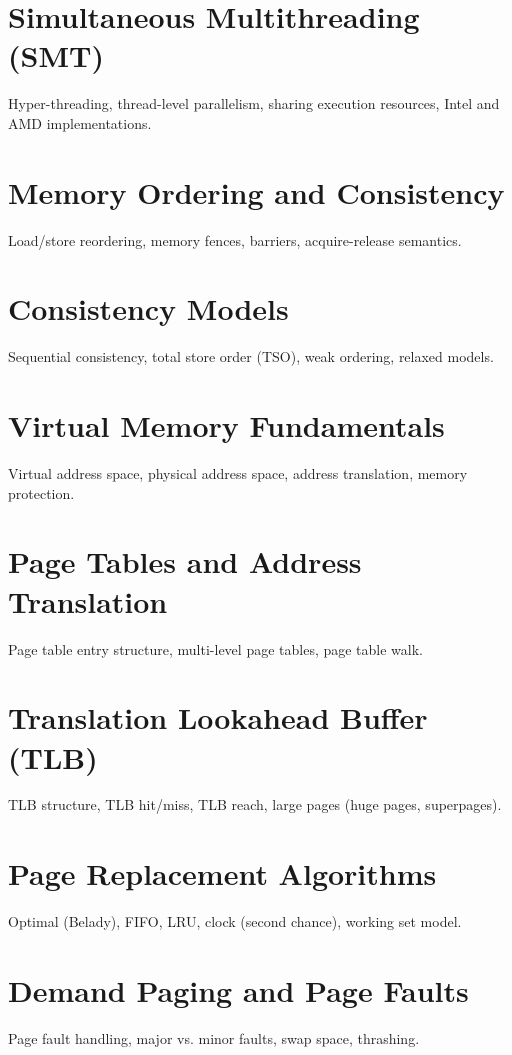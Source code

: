 \chapter{Simultaneous Multithreading (SMT)}
Hyper-threading, thread-level parallelism, sharing execution resources, Intel and AMD implementations.

\chapter{Memory Ordering and Consistency}
Load/store reordering, memory fences, barriers, acquire-release semantics.

\chapter{Consistency Models}
Sequential consistency, total store order (TSO), weak ordering, relaxed models.


\chapter{Virtual Memory Fundamentals}
Virtual address space, physical address space, address translation, memory protection.

\chapter{Page Tables and Address Translation}
Page table entry structure, multi-level page tables, page table walk.

\chapter{Translation Lookahead Buffer (TLB)}
TLB structure, TLB hit/miss, TLB reach, large pages (huge pages, superpages).

\chapter{Page Replacement Algorithms}
Optimal (Belady), FIFO, LRU, clock (second chance), working set model.

\chapter{Demand Paging and Page Faults}
Page fault handling, major vs. minor faults, swap space, thrashing.

